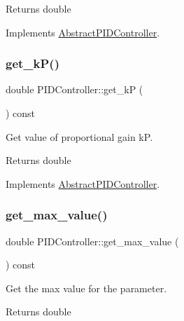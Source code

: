 \begin{DoxyReturn}{Returns}
double 
\end{DoxyReturn}


Implements \hyperlink{classAbstractPIDController}{Abstract\+P\+I\+D\+Controller}.

\mbox{\label{classPIDController_ac838d1c775ff75c7845602b189e5f214}} 
\subsubsection{\texorpdfstring{get\+\_\+k\+P()}{get\_kP()}}
{\footnotesize\ttfamily double P\+I\+D\+Controller\+::get\+\_\+kP (\begin{DoxyParamCaption}{ }\end{DoxyParamCaption}) const\hspace{0.3cm}{\ttfamily [virtual]}}



Get value of proportional gain kP. 

\begin{DoxyReturn}{Returns}
double 
\end{DoxyReturn}


Implements \hyperlink{classAbstractPIDController}{Abstract\+P\+I\+D\+Controller}.

\mbox{\label{classPIDController_ad4420e831743f6b66303f6a24bf7fbdc}} 
\subsubsection{\texorpdfstring{get\+\_\+max\+\_\+value()}{get\_max\_value()}}
{\footnotesize\ttfamily double P\+I\+D\+Controller\+::get\+\_\+max\+\_\+value (\begin{DoxyParamCaption}{ }\end{DoxyParamCaption}) const\hspace{0.3cm}{\ttfamily [virtual]}}



Get the max value for the parameter. 

\begin{DoxyReturn}{Returns}
double 
\end{DoxyReturn}



